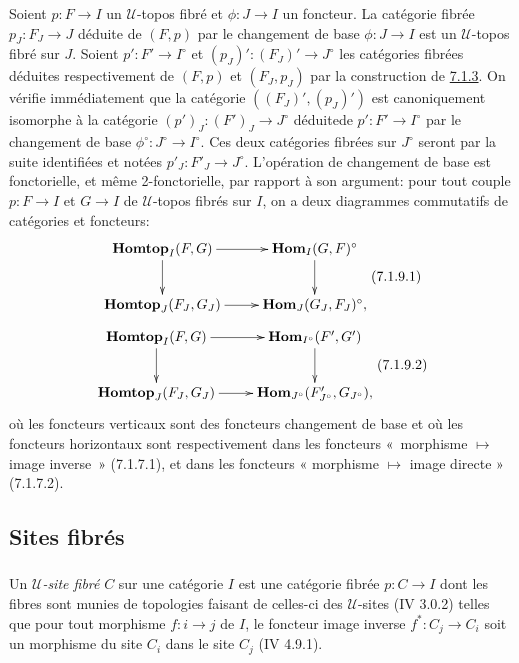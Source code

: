 \documentclass[10pt]{../fichiers-configuration-latex/smfart}
\begin{document}
Soient $p : F \to I$ un $𝒰$-topos fibré et $\phi : J \to I$
un foncteur. La catégorie fibrée $p_J : F_J \to J$ déduite de $(F,
p)$ par le changement de base $\phi : J \to I$ est un
$𝒰$-topos fibré sur $J$. Soient $p': F'\to I^{\circ}$ et
$(p_J)': (F_J)'\to J^{\circ}$ les catégories fibrées déduites
respectivement de $(F, p)$ et $(F_J, p_J)$ par la construction de
\hyperref[VI.subsubsec7.1.3]{7.1.3}. On vérifie immédiatement que la catégorie
$((F_J)', (p_J)')$ est canoniquement isomorphe à la catégorie
$(p')_J : (F')_J \to J^{\circ}$ déduite\pageoriginale de $p': F'\to
I^{\circ}$ par le changement de base $\phi^{\circ} : J^{\circ} \to
I^{\circ}$. Ces deux catégories fibrées sur $J^{\circ}$ seront par
la suite identifiées et notées $p'_J : F'_J \to J^{\circ}$.
L'opération de changement de base est fonctorielle, et même
2-fonctorielle, par rapport à son argument: pour tout couple $p : F
\to I$ et $G \to I$ de $𝒰$-topos fibrés sur $I$, on a deux
diagrammes commutatifs de catégories et foncteurs:
\[\vcenter{
\xymatrix{
\Hhomtop_I(F,G) \ar[r] \ar[d]& \Hhom_I(G,F)^{\circ} \ar[d]\\
\Hhomtop_J(F_J,G_J) \ar[r]& \Hhom_J(G_J,F_J)^{\circ},
}}\leqno(7.1.9.1)
\]
\[\vcenter{
\xymatrix{
\Hhomtop_I(F,G) \ar[r] \ar[d]& \Hhom_{I^{\circ}}(F',G') \ar[d]\\
\Hhomtop_J(F_J,G_J) \ar[r]&
\Hhom_{J^{\circ}}(F'_{J^{\circ}},G_{J^{\circ}}),
}}\leqno{(7.1.9.2)}
\]
où les foncteurs verticaux sont des foncteurs changement de base
et où les
foncteurs horizontaux sont respectivement dans 
les foncteurs
« morphisme $\mapsto$ image inverse » (7.1.7.1), et
dans 
les foncteurs « morphisme $\mapsto$ image directe » (7.1.7.2).

\subsection{Sites fibrés}

\subsubsection{}

Un \emph{$𝒰$-site fibré} $C$ sur une catégorie $I$ est une catégorie
fibrée $p : C \to I$ dont les fibres sont munies de topologies faisant
de celles-ci des $𝒰$-sites (IV 3.0.2) telles que pour tout morphisme
$f : i \to j$ de $I$, le foncteur image inverse $f^{\ast} : C_j \to
C_i$ soit un morphisme du site $C_i$ dans le site $C_j$ (IV 4.9.1).
\end{document}
